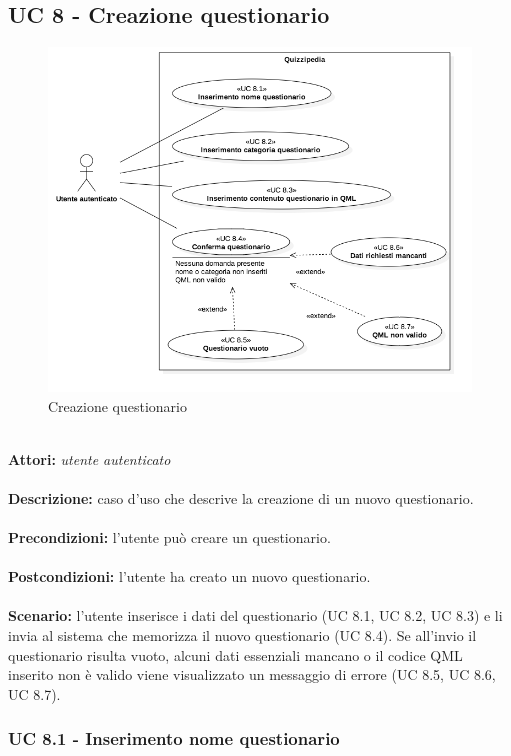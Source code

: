 \documentclass[a4paper,11pt]{article}
\begin{document}
\newpage
\subsection{UC 8 - Creazione questionario}

\begin{figure}[h!]
\centering
\includegraphics[scale=0.6]{../immagini/UC8.png}
\caption{Creazione questionario}
\end{figure}
\ \\
\textbf{Attori:} \textit{utente autenticato}
\\ \\
\textbf{Descrizione:} caso d'uso che descrive la creazione di un nuovo questionario.\\
\\
\textbf{Precondizioni:} l'utente può creare un questionario.\\
\\
\textbf{Postcondizioni:} l’utente ha creato un nuovo questionario.\\
\\
\textbf{Scenario:} l’utente inserisce i dati del questionario (UC 8.1, UC 8.2, UC 8.3) e li invia al sistema che memorizza il nuovo questionario (UC 8.4). Se all'invio il questionario risulta vuoto, alcuni dati essenziali mancano o il codice QML inserito non è valido viene visualizzato un messaggio di errore (UC 8.5, UC 8.6, UC 8.7).\\


\subsubsection{UC 8.1 - Inserimento nome questionario}
\end{document}
